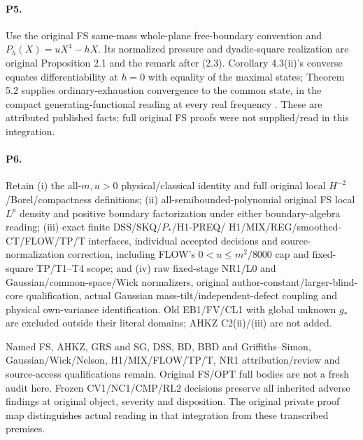 \paragraph{P5.}
Use the original FS same-mass whole-plane free-boundary convention and
$P_h(X)=uX^4-hX$. Its normalized pressure and dyadic-square realization
are original Proposition 2.1 and the remark after (2.3). Corollary 4.3(ii)'s
converse equates differentiability at $h=0$ with equality of the maximal
states; Theorem 5.2 supplies ordinary-exhaustion convergence to the common
state, in the compact generating-functional reading at every real frequency
\citep{FS1977}. These are attributed published facts; full original FS
proofs were not supplied/read in this integration.

\paragraph{P6.}
Retain (i) the all-$m,u>0$ physical/classical identity and full original
local $H^{-2}$/Borel/compactness definitions; (ii) all-semibounded-polynomial
original FS local $L^p$ density and positive boundary factorization under
either boundary-algebra reading; (iii) exact finite DSS/SKQ/$P_*$/H1-PREQ/
H1/MIX/REG/smoothed-CT/FLOW/TP/T interfaces, individual accepted decisions
and source-normalization correction, including FLOW's $0<u\le m^2/8000$
cap and fixed-square TP/T1--T4 scope; and (iv) raw fixed-stage NR1/L0 and
Gaussian/common-space/Wick normalizers, original author-constant/larger-blind-core
qualification, actual Gaussian mass-tilt/independent-defect coupling and
physical own-variance identification. Old EB1/FV/CL1 with global unknown
$g_*$ are excluded outside their literal domains; AHKZ C2(ii)/(iii) are
not added.

Named FS, AHKZ, GRS and SG, DSS, BD, BBD and Griffiths--Simon,
Gaussian/Wick/Nelson, H1/MIX/FLOW/TP/T, NR1 attribution/review and source-access qualifications
remain. Original FS/OPT full bodies are not a fresh audit here. Frozen
CV1/NC1/CMP/RL2 decisions preserve all inherited adverse findings at
original object, severity and disposition. The original private proof map distinguishes
actual reading in that integration from these transcribed premises.

